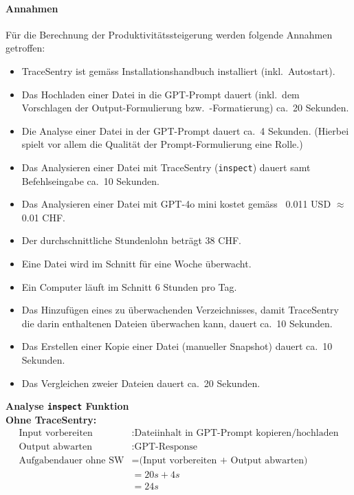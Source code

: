 \documentclass[a4paper,12pt]{report}
\begin{document}
    \paragraph*{Annahmen}
    Für die Berechnung der Produktivitätssteigerung werden folgende Annahmen getroffen:
    \begin{itemize}
        \item TraceSentry ist gemäss Installationshandbuch installiert (inkl.\ Autostart).
        \item Das Hochladen einer Datei in die GPT-Prompt dauert (inkl.\ dem Vorschlagen der Output-Formulierung bzw.\ -Formatierung) ca.\ 20 Sekunden.
        \item Die Analyse einer Datei in der GPT-Prompt dauert ca.\ 4 Sekunden.
        (Hierbei spielt vor allem die Qualität der Prompt-Formulierung eine Rolle.)
        \item Das Analysieren einer Datei mit TraceSentry (\texttt{inspect}) dauert samt Befehlseingabe ca.\ 10 Sekunden.
        \item Das Analysieren einer Datei mit GPT-4o mini kostet gemäss~ 0.011 USD $\approx$ 0.01 CHF.
        \item Der durchschnittliche Stundenlohn beträgt 38 CHF\@.
        \item Eine Datei wird im Schnitt für eine Woche überwacht.
        \item Ein Computer läuft im Schnitt 6 Stunden pro Tag.
        \item Das Hinzufügen eines zu überwachenden Verzeichnisses, damit TraceSentry die darin enthaltenen Dateien überwachen kann, dauert ca.\ 10 Sekunden.
        \item Das Erstellen einer Kopie einer Datei (manueller Snapshot) dauert ca.\ 10 Sekunden.
        \item Das Vergleichen zweier Dateien dauert ca.\ 20 Sekunden.
    \end{itemize}

    \clearpage

    \textbf{Analyse \texttt{inspect} Funktion} \\

    \textbf{Ohne TraceSentry:} \\
    \begin{align*}
        \text{Input vorbereiten}&: \text{Dateiinhalt in GPT-Prompt kopieren/hochladen}\\
        \text{Output abwarten}&: \text{GPT-Response} \\
        \text{Aufgabendauer ohne SW} &= \text{(Input vorbereiten + Output abwarten)} \\
        &= 20s + 4s \\
        &= 24s \\
    \end{align*}
\end{document}

